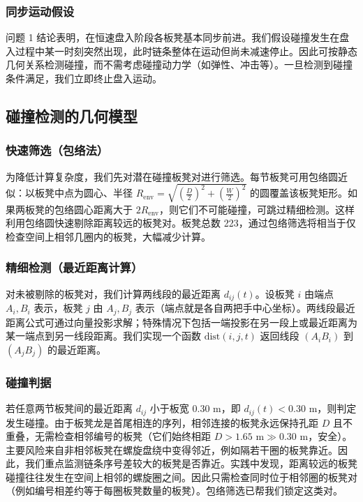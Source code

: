 \documentclass[UTF8]{ctexart}
\begin{document}
\subsubsection{同步运动假设}
问题 1 结论表明，在恒速盘入阶段各板凳基本同步前进。我们假设碰撞发生在盘入过程中某一时刻突然出现，此时链条整体在运动但尚未减速停止。因此可按静态几何关系检测碰撞，而不需考虑碰撞动力学（如弹性、冲击等）。一旦检测到碰撞条件满足，我们立即终止盘入运动。

\subsection{碰撞检测的几何模型}

\subsubsection{快速筛选（包络法）}
为降低计算复杂度，我们先对潜在碰撞板凳对进行筛选。每节板凳可用包络圆近似：以板凳中点为圆心、半径 $R_{\text{env}}= \sqrt{\left(\frac{D}{2}\right)^2+\left(\frac{W}{2}\right)^2}$ 的圆覆盖该板凳矩形。如果两板凳的包络圆心距离大于 $2R_{\text{env}}$，则它们不可能碰撞，可跳过精细检测。这样利用包络圆快速剔除距离较远的板凳对。板凳总数 223，通过包络筛选将相当于仅检查空间上相邻几圈内的板凳，大幅减少计算。

\subsubsection{精细检测（最近距离计算）}
对未被剔除的板凳对，我们计算两线段的最近距离 $d_{ij}(t)$。设板凳 $i$ 由端点 $A_i,B_i$ 表示，板凳 $j$ 由 $A_j,B_j$ 表示（端点就是各自两把手中心坐标）。两线段最近距离公式可通过向量投影求解；特殊情况下包括一端投影在另一段上或最近距离为某一端点到另一线段距离。我们实现一个函数 $\text{dist}(i,j,t)$ 返回线段 $(A_iB_i)$ 到 $(A_jB_j)$ 的最近距离。

\subsubsection{碰撞判据}
若任意两节板凳间的最近距离 $d_{ij}$ 小于板宽 0.30 m，即 $d_{ij}(t)<0.30\text{ m}$，则判定发生碰撞。由于板凳龙是首尾相连的序列，相邻连接的板凳永远保持孔距 $D$ 且不重叠，无需检查相邻编号的板凳（它们始终相距 $D>1.65\text{ m}\gg0.30$ m，安全）。主要风险来自非相邻板凳在螺旋盘绕中变得邻近，例如隔若干圈的板凳靠近。因此，我们重点监测链条序号差较大的板凳是否靠近。实践中发现，距离较远的板凳碰撞往往发生在空间上相邻的螺旋圈之间。因此只需检查同时位于相邻圈的板凳对（例如编号相差约等于每圈板凳数量的板凳）。包络筛选已帮我们锁定这类对。
\end{document}
